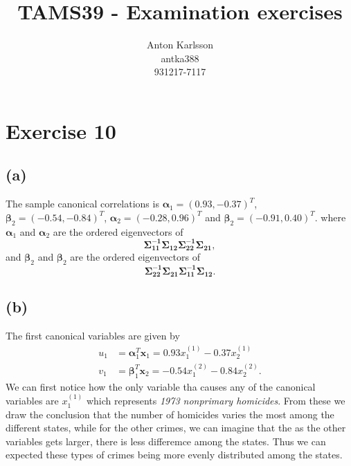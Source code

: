 \message{ !name(examination.tex)}\documentclass[one column]{report}
\title{TAMS39 - Examination exercises}
\author{Anton Karlsson\\antka388\\931217-7117}
\date{}
\renewcommand{\b}[1]{\bm{#1}}
\begin{document}

\section*{Exercise 10}
\label{sec:exercise-10}

\subsection*{(a)}
\label{sec:a-6}

The sample canonical correlations is $\b\alpha_1  = (0.93, -0.37  )^T$,
$\b \beta_2 = (-0.54, -0.84 )^T$, $\b \alpha_2 = (-0.28,  0.96 )^T$ and $\b
\beta_2 = (-0.91,0.40)^T$. where $\b \alpha_1$ and $\b \alpha_2$ are the
ordered eigenvectors of 
\begin{equation*}
  \b{\Sigma^{-1}_{11}\Sigma_{12}\Sigma_{22}^{-1}\Sigma_{21}}, 
\end{equation*}
and $\b \beta_2$ and $\b \beta_2$ are  the ordered eigenvectors of 
\begin{equation*}
  \b{\Sigma^{-1}_{22}\Sigma_{21}\Sigma_{11}^{-1}\Sigma_{12}}.
\end{equation*}

\subsection*{(b)}
\label{sec:b-9}

The first canonical variables are given by
\begin{align*}
  u_1 &= \b \alpha_1^T \b x_1= 0.93 x_1^{(1)} - 0.37 x_2^{(1)} \\
  v_1 &= \b \beta_1^T \b x_2 = -0.54 x_1^{(2)} - 0.84 x_2^{(2)}.
\end{align*}
We can first notice how the only variable tha causes any of the
canonical variables are $x_1^{(1)}$ which represents \textit{1973
  nonprimary homicides}. From these we draw the conclusion that the
number of homicides varies the most among the different states, while
for the other crimes, we can imagine that the as the other variables
gets larger, there is less differemce among the states. Thus we can
expected these types of crimes being more evenly distributed among the states.


\end{document}
